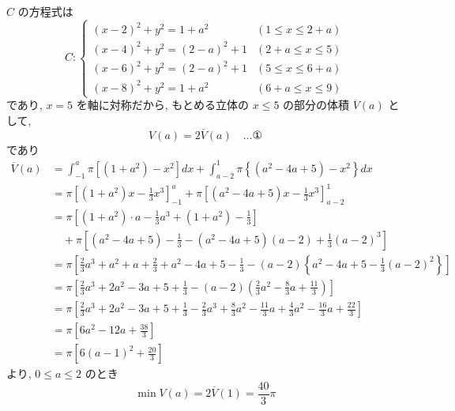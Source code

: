 \documentclass[../main.tex]{subfiles}
\begin{document}
$C$ の方程式は
\[
  C:
  \begin{cases}
    (x-2)^2 + y^2 = 1+a^2 & (1 \le x \le 2+a) \\
    (x-4)^2 + y^2 = (2-a)^2 + 1 & (2+a \le x \le 5) \\
    (x-6)^2 + y^2 = (2-a)^2 + 1 & (5 \le x \le 6+a) \\
    (x-8)^2 + y^2 = 1+a^2 & (6+a \le x \le 9)
  \end{cases}
\]
であり, $x=5$ を軸に対称だから, もとめる立体の $x \le 5$ の部分の体積 $\overline{V}(a)$ として,
\[
  V(a) = 2\overline{V}(a) \quad \dots \text{①}
\]
であり
\begin{align*}
  \overline{V}(a) &= \int_{-1}^a \pi \left[ (1+a^2) - x^2 \right] dx + \int_{a-2}^1 \pi \left\{ (a^2-4a+5) - x^2 \right\} dx \\
  &= \pi \left[ (1+a^2)x - \frac{1}{3}x^3 \right]_{-1}^a + \pi \left[ (a^2-4a+5)x - \frac{1}{3}x^3 \right]_{a-2}^1 \\
  &= \pi \left[ (1+a^2)\cdot a - \frac{1}{3}a^3 + (1+a^2) - \frac{1}{3} \right] \\
  &\quad + \pi \left[ (a^2-4a+5) - \frac{1}{3} - (a^2-4a+5)(a-2) + \frac{1}{3}(a-2)^3 \right] \\
  &= \pi \left[ \frac{2}{3}a^3 + a^2 + a + \frac{2}{3} + a^2 - 4a + 5 - \frac{1}{3} - (a-2)\left\{ a^2-4a+5 - \frac{1}{3}(a-2)^2 \right\} \right] \\
  &= \pi \left[ \frac{2}{3}a^3 + 2a^2 - 3a + 5 + \frac{1}{3} - (a-2)\left( \frac{2}{3}a^2 - \frac{8}{3}a + \frac{11}{3} \right) \right] \\
  &= \pi \left[ \frac{2}{3}a^3 + 2a^2 - 3a + 5 + \frac{1}{3} - \frac{2}{3}a^3 + \frac{8}{3}a^2 - \frac{11}{3}a + \frac{4}{3}a^2 - \frac{16}{3}a + \frac{22}{3} \right] \\
  &= \pi \left[ 6a^2 - 12a + \frac{38}{3} \right] \\
  &= \pi \left[ 6(a-1)^2 + \frac{20}{3} \right]
\end{align*}
より, $0 \le a \le 2$ のとき
\[
  \min V(a) = 2\overline{V}(1) = \frac{40}{3}\pi
\]


\newpage

\subsection*{}
\end{document}
